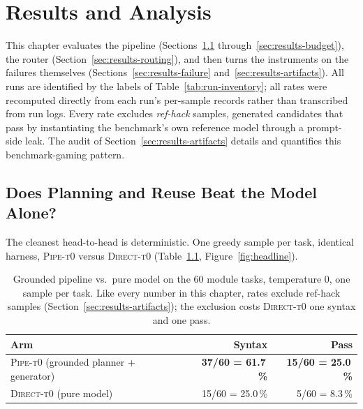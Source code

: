 
\chapter{Results and Analysis}
\label{ch:05}

This chapter evaluates the pipeline (Sections~\ref{sec:results-headline}
through~\ref{sec:results-budget}), the router
(Section~\ref{sec:results-routing}), and then turns the instruments on the
failures themselves (Sections~\ref{sec:results-failure}
and~\ref{sec:results-artifacts}). All runs are identified by the labels of
Table~\ref{tab:run-inventory}; all rates were recomputed directly from each
run's per-sample records rather than transcribed from run logs. Every
rate excludes \emph{ref-hack} samples, generated candidates that pass by
instantiating the benchmark's own reference model through a prompt-side
leak. The audit of Section~\ref{sec:results-artifacts} details and
quantifies this benchmark-gaming pattern.

\section{Does Planning and Reuse Beat the Model Alone?}
\label{sec:results-headline}

The cleanest head-to-head is deterministic. One greedy sample per task,
identical harness, \textsc{Pipe-t0} versus \textsc{Direct-t0}
(Table~\ref{tab:headline}, Figure~\ref{fig:headline}).

\begin{table}[htbp]
  \centering
  \caption[Headline comparison at temperature 0]{Grounded pipeline vs.\ pure
    model on the 60 module tasks, temperature 0, one sample per task.
    Like every number in this chapter, rates exclude ref-hack samples
    (Section~\ref{sec:results-artifacts}); the exclusion costs
    \textsc{Direct-t0} one syntax and one pass.}
  \label{tab:headline}
  \begin{tabular}{lrr}
    \toprule
    Arm & Syntax & Pass \\
    \midrule
    \textsc{Pipe-t0} (grounded planner + generator) & \textbf{37/60 = 61.7\,\%} & \textbf{15/60 = 25.0\,\%} \\
    \textsc{Direct-t0} (pure model)                 & 15/60 = 25.0\,\% & 5/60 = 8.3\,\% \\
    \bottomrule
  \end{tabular}
\end{table}


